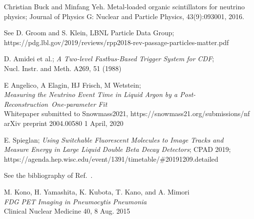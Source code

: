 \documentclass[12pt]{article}
\begin{document}
\begin{thebibliography}{99}
  Christian Buck and Minfang Yeh. Metal-loaded
organic scintillators for neutrino physics; Journal of Physics G: Nuclear and Particle
Physics, 43(9):093001, 2016.

 See D. Groom and S. Klein, LBNL Particle Data
Group;\\
https://pdg.lbl.gov/2019/reviews/rpp2018-rev-passage-particles-matter.pdf

  D. Amidei et al.; {\it A Two-level
 Fastbus-Based Trigger System for CDF};\\
 Nucl. Instr. and Meth. A269,  51 (1988)

E Angelico, A Elagin, HJ Frisch, M Wetstein;\\
{\it Measuring the Neutrino Event Time in Liquid Argon by a
Post-Reconstruction\
 One-parameter Fit}\\
Whitepaper submitted to Snowmass2021, https://snowmass21.org/submissions/nf\\
 arXiv preprint 2004.00580 1 April, 2020

 E. Spieglan; {\it Using Switchable Fluorescent
  Molecules to Image Tracks and Measure Energy in Large Liquid Double
  Beta Decay Detectors}; CPAD 2019;
  https://agenda.hep.wisc.edu/event/1391/timetable/\#20191209.detailed

 See the bibliography of Ref.~\cite{PET_NIM_paper}.

 M. Kono, H. Yamashita, K. Kubota, T. Kano, and A. Mimori\\
{\it FDG PET Imaging in Pneumocytis Pneumonia}\\
Clinical Nuclear Medicine 40, 8 Aug. 2015

\end{thebibliography}
\end{document}
